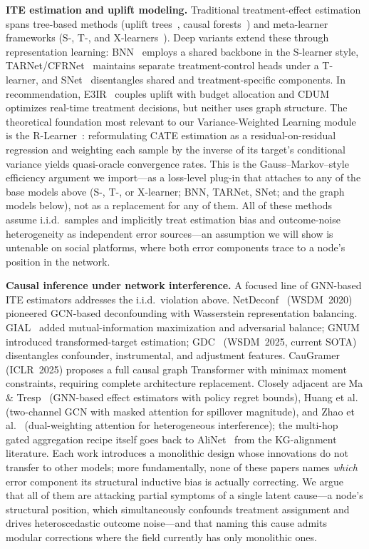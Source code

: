 \documentclass[sigconf,anonymous,review]{acmart}
\begin{document}
\textbf{ITE estimation and uplift modeling.}
Traditional treatment-effect estimation spans tree-based methods (uplift trees~\cite{radcliffe2011real}, causal forests~\cite{athey2016recursive}) and meta-learner frameworks (S-, T-, and X-learners~\cite{kunzel2019metalearners, kennedy2023towards}). Deep variants extend these through representation learning: BNN~\cite{johansson2016learning} employs a shared backbone in the S-learner style, TARNet/CFRNet~\cite{shalit2017estimating} maintains separate treatment-control heads under a T-learner, and SNet~\cite{curth2021nonparametric} disentangles shared and treatment-specific components. In recommendation, E3IR~\cite{sun2024e3ir} couples uplift with budget allocation and CDUM~\cite{meng2025cdum} optimizes real-time treatment decisions, but neither uses graph structure. The theoretical foundation most relevant to our Variance-Weighted Learning module is the R-Learner~\cite{nie2021rlearner}: reformulating CATE estimation as a residual-on-residual regression and weighting each sample by the inverse of its target's conditional variance yields quasi-oracle convergence rates. This is the Gauss--Markov--style efficiency argument we import---as a loss-level plug-in that attaches to any of the base models above (S-, T-, or X-learner; BNN, TARNet, SNet; and the graph models below), not as a replacement for any of them. All of these methods assume i.i.d.\ samples and implicitly treat estimation bias and outcome-noise heterogeneity as independent error sources---an assumption we will show is untenable on social platforms, where both error components trace to a node's position in the network.

\textbf{Causal inference under network interference.}
A focused line of GNN-based ITE estimators addresses the i.i.d.\ violation above. NetDeconf~\cite{guo2020learning} (WSDM~2020) pioneered GCN-based deconfounding with Wasserstein representation balancing. GIAL~\cite{chu2021graph} added mutual-information maximization and adversarial balance; GNUM~\cite{zhu2023gnum} introduced transformed-target estimation; GDC~\cite{hu2025gdc} (WSDM~2025, current SOTA) disentangles confounder, instrumental, and adjustment features. CauGramer~\cite{wu2025caugramer} (ICLR~2025) proposes a full causal graph Transformer with minimax moment constraints, requiring complete architecture replacement. Closely adjacent are Ma \& Tresp~\cite{ma2021causal} (GNN-based effect estimators with policy regret bounds), Huang et al.~\cite{huang2023modeling} (two-channel GCN with masked attention for spillover magnitude), and Zhao et al.~\cite{zhao2024learning} (dual-weighting attention for heterogeneous interference); the multi-hop gated aggregation recipe itself goes back to AliNet~\cite{sun2020knowledge} from the KG-alignment literature. Each work introduces a monolithic design whose innovations do not transfer to other models; more fundamentally, none of these papers names \emph{which} error component its structural inductive bias is actually correcting. We argue that all of them are attacking partial symptoms of a single latent cause---a node's structural position, which simultaneously confounds treatment assignment and drives heteroscedastic outcome noise---and that naming this cause admits modular corrections where the field currently has only monolithic ones.
\end{document}
